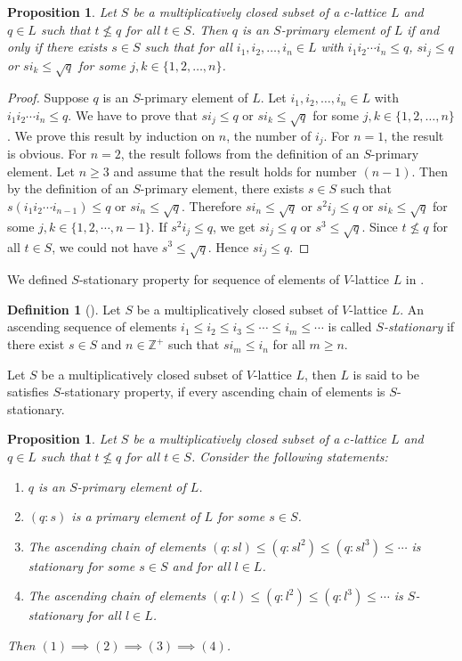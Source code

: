 \documentclass[10pt,twoside,a4paper]{amsart}
\numberwithin{equation}{section}
\theoremstyle{plain}
\newtheorem{prop}[lem]{Proposition}
\theoremstyle{definition}
\newtheorem{defn}[lem]{Definition}
\begin{document}
\begin{prop}%
	Let $S$ be a multiplicatively closed subset of a $c$-lattice $L$ and $q\in L$ such that $t\nleq q$ for all $t\in S$. Then $q$ is an $S$-primary element of $L$ if and only if there exists $s\in S$ such that for all $i_1,i_2,\dots,i_n\in L$ with $i_1i_2\cdots i_n\leq q $, $si_j\leq q$ or $si_k\leq \sqrt{q}$ for some $j,k\in \{1,2,\dots,n\}$.
\end{prop}	
\begin{proof} 
	Suppose $q$ is an $S$-primary element of $L$. Let $i_1,i_2,\dots,i_n\in L$ with $i_1i_2\cdots i_n\leq q $. We have to prove that $si_j\leq q$ or $si_k\leq \sqrt{q}$ for some $j,k\in \{1,2,\dots,n\}$. We prove this result by induction on $n$, the number of $i_j$. For $n=1$, the result is obvious. For $n=2$, the result follows from the definition of an $S$-primary element. Let $n\geq 3$ and assume that the result holds for number $(n-1)$. Then by the definition of an $S$-primary element, there exists $s\in S$ such that $s(i_1 i_2\cdots i_{n-1})\leq q$ or $si_n\leq \sqrt{q}$. Therefore $si_n\leq \sqrt{q}$ or $s^2 i_j \leq q$ or $s i_k \leq \sqrt{q}$ for some $j,k \in \{1,2,\cdots ,n-1\}$. If $s^2 i_j \leq q$, we get $s i_j\leq q $ or $ s^3\leq \sqrt{q}$. Since $t \nleq q$ for all $t \in S$, we could not have $s^3 \leq \sqrt{q}$. Hence  $s i_j \leq q$.
\end{proof}	


We defined $S$-stationary property for sequence of elements of $V$-lattice $L$ in \cite{SPJ2}.

\begin{defn}[\cite{SPJ2}]
	Let $S$ be a multiplicatively closed subset of $V$-lattice $L$. An ascending sequence of elements $i_1 \leq i_2 \leq i_3 \leq \cdots \leq i_m  \leq \cdots $ is called \textit{$S$-stationary} if there exist $s \in S$ and $ n \in \mathbb{Z}^{+}$ such that $s  i_m \leq i_n$ for all $m \geq n$. 
	
	Let $S$ be a multiplicatively closed subset of $V$-lattice $L$, then  $L$ is said to be satisfies $S$-stationary property, if every ascending chain of elements is $S$-stationary.	
\end{defn}


\begin{prop}%
	Let $S$ be a multiplicatively closed subset of a $c$-lattice $L$ and $q\in L$ such that $t\nleq q$ for all $t\in S$. Consider the following statements:
	\begin{enumerate}
		\item $q$ is an $S$-primary element of $L$.
		\item $(q:s)$ is a primary element of $L$ for some $s\in S$.
		\item The ascending chain of elements $(q:sl) \leq (q:sl^2) \leq (q:sl^3) \leq \cdots $ is stationary for some $s \in S$ and for all $l \in L$.
		\item The ascending chain of elements $(q:l) \leq (q:l^2) \leq (q:l^3) \leq \cdots $ is $S$-stationary for all $l \in L$.
	\end{enumerate}
	Then $(1)\implies (2)\implies (3) \implies (4)$.
\end{prop}	
\end{document}

